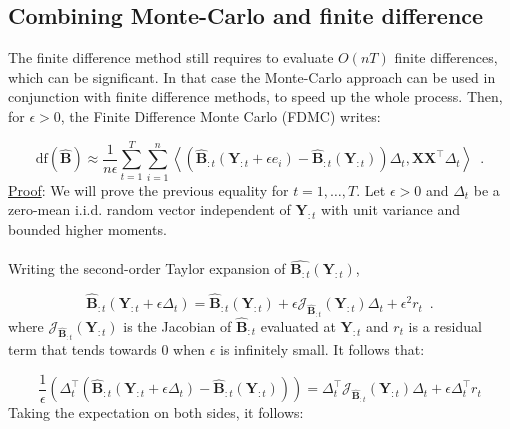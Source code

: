 \documentclass[a4paper,10pt]{article}
\theoremstyle{definition}
\begin{document}
\subsection*{Combining Monte-Carlo and finite difference}

The finite difference method still requires to evaluate $O(nT)$ finite differences, which can be significant. In that case the
Monte-Carlo approach can be used in conjunction with finite difference methods, to speed up the whole process. Then, for $\epsilon > 0$,
the Finite Difference Monte Carlo (FDMC) writes:

\begin{equation*}
    \text{df}(\hat{\mathbf{B}}) \approx \frac{1}{n\epsilon}
    \sum_{t=1}^T \sum_{i=1}^n
    \left \langle
            \left(
                \mathbf{\hat{B}}_{:t}(\mathbf{Y}_{:t} + \epsilon e_i)
                - \mathbf{\hat{B}}_{:t}(\mathbf{Y}_{:t})
            \right) \Delta_t
            ,
            \mathbf{XX}^{\top} \Delta_t
    \right \rangle
    \enspace .
\end{equation*}
%
\underline{Proof}: We will prove the previous equality for $t=1, \dots, T$. Let
$\epsilon > 0$ and $\Delta_t$ be a zero-mean i.i.d. random vector independent of
$\mathbf{Y}_{:t}$ with unit variance and bounded higher moments.
\\
\\
Writing the second-order Taylor expansion of $\hat{\mathbf{B}_{:t}}(\mathbf{Y}_{:t})$,

\begin{equation*}
    \hat{\mathbf{B}}_{:t}(\mathbf{Y}_{:t} + \epsilon \Delta_t) =
    \hat{\mathbf{B}}_{:t}(\mathbf{Y}_{:t})
    + \epsilon \mathcal{J}_{\hat{\mathbf{B}}_{:t}}(\mathbf{Y}_{:t}) \Delta_t
    + \epsilon^2 r_t
    \enspace .
\end{equation*}
%
where $\mathcal{J}_{\hat{\mathbf{B}}_{:t}}(\mathbf{Y}_{:t})$ is the Jacobian of $\hat{\mathbf{B}}_{:t}$
evaluated at $\mathbf{Y}_{:t}$ and $r_t$ is a residual term that tends towards 0 when $\epsilon$ is infinitely
small. It follows that:

\begin{equation*}
    \frac{1}{\epsilon}
        \left(
            \Delta_t^{\top} (\hat{\mathbf{B}}_{:t}(\mathbf{Y}_{:t}
            + \epsilon \Delta_t) - \hat{\mathbf{B}}_{:t}(\mathbf{Y}_{:t}))
        \right)
    =
    \Delta_t^{\top} \mathcal{J}_{\hat{\mathbf{B}}_{:t}}(\mathbf{Y}_{:t}) \Delta_t
    + \epsilon \Delta_t^{\top}r_t
\end{equation*}
%
Taking the expectation on both sides, it follows:
\end{document}
